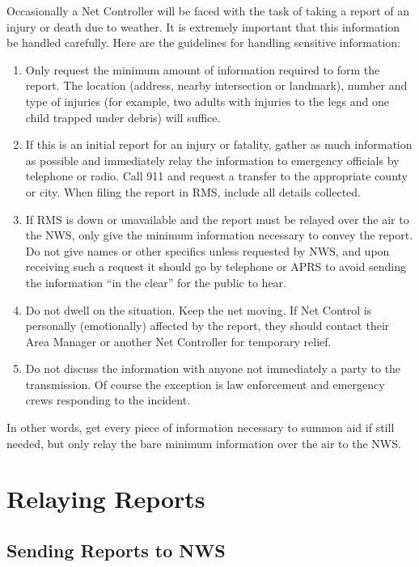 \documentclass[pdflatex,letterpaper,twoside,12pt]{book}
\begin{document}
Occasionally a Net Controller will be faced with the task of taking a report of an injury or death due to weather.  It is extremely important that this information be handled carefully.  Here are the guidelines for handling sensitive information:

\begin{enumerate}
\item Only request the minimum amount of information required to form the report.  The location (address, nearby intersection or landmark), number and type of injuries (for example, two adults with injuries to the legs and one child trapped under debris) will suffice.
\item If this is an initial report for an injury or fatality, gather as much information as possible and immediately relay the information to emergency officials by telephone or radio. Call 911 and request a transfer to the appropriate county or city.  When filing the report in RMS, include all details collected.
\item If RMS is down or unavailable and the report must be relayed over the air to the NWS, only give the minimum information necessary to convey the report.  Do not give names or other specifics unless requested by NWS, and upon receiving such a request it should go by telephone or APRS to avoid sending the information ``in the clear'' for the public to hear.
\item Do not dwell on the situation.  Keep the net moving.  If Net Control is personally (emotionally) affected by the report, they should contact their Area Manager or another Net Controller for temporary relief.
\item Do not discuss the information with anyone not immediately a party to the transmission.  Of course the exception is law enforcement and emergency crews responding to the incident.
\end{enumerate}

In other words, get every piece of information necessary to summon aid if still needed, but only relay the bare minimum information over the air to the NWS.


\section{Relaying Reports}\label{relaying}

\subsection{Sending Reports to NWS}
\end{document}
